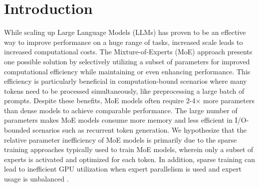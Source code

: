 \section{Introduction}
While scaling up Large Language Models (LLMs) has proven to be an effective way to improve performance on a huge range of tasks, increased scale leads to increased computational costs. The Mixture-of-Experts (MoE) approach \cite{shazeer2017outrageously, fedus2022switch, shen2023moduleformer, jiang2024mixtral} presents one possible solution by selectively utilizing a subset of parameters for improved computational efficiency while maintaining or even enhancing performance. This efficiency is particularly beneficial in computation-bound scenarios where many tokens need to be processed simultaneously, like preprocessing a large batch of prompts. Despite these benefits, MoE models often require 2-4$\times$ more parameters than dense models \cite{dai2024deepseekmoe, shen2023moduleformer} to achieve comparable performance. The large number of parameters makes MoE models consume more memory and less efficient in I/O-bounded scenarios such as recurrent token generation. We hypothesize that the relative parameter inefficiency of MoE models is primarily due to the sparse training approaches typically used to train MoE models, wherein only a subset of experts is activated and optimized for each token. In addition, sparse training can lead to inefficient GPU utilization when expert parallelism is used and expert usage is unbalanced \cite{gale2023megablocks}.

